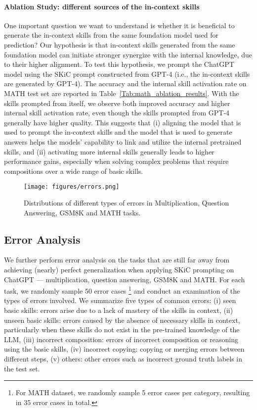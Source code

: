 \paragraph{Ablation Study: different sources of the in-context skills} One important question we want to understand is whether it is beneficial to generate the in-context skills from the same foundation model used for prediction? Our hypothesis is that in-context skills generated from the same foundation model can initiate stronger synergize with the internal knowledge, due to their higher alignment. To test this hypothesis, we prompt the ChatGPT model using the SKiC prompt constructed from GPT-4 (i.e., the in-context skills are generated by GPT-4). The accuracy and the internal skill activation rate on MATH test set are reported in Table~\ref{Tab:math_ablation_results}. With the skills prompted from itself, we observe both improved accuracy and higher internal skill activation rate, even though the skills prompted from GPT-4 generally have higher quality. This suggests that (i) aligning the model that is used to prompt the in-context skills and the model that is used to generate answers helps the models' capability to link and utilize the internal pretrained skills, and (ii) activating more internal skills generally leads to higher performance gains, especially when solving complex problems that require compositions over a wide range of basic skills.


 
\begin{figure}[t]
    \centering
    \texttt{[image: figures/errors.png]}
    \caption{Distributions of different types of errors in Multiplication, Question Answering, GSM8K and MATH tasks.}
    \label{fig:errors}
\end{figure}

\subsection{Error Analysis}
We further perform error analysis on the tasks that are still far away from achieving (nearly) perfect generalization when applying SKiC prompting on ChatGPT --- multiplication, question answering, GSM8K and MATH. For each task, we randomly sample 50 error cases \footnote{For MATH dataset, we randomly sample 5 error cases per category, resulting in 35 error cases in total.} \citep{zhou2022least} and conduct an examination of the types of errors involved. We summarize five types of common errors: (i) seen basic skills: errors arise due to a lack of mastery of the skills in context, (ii) unseen basic skills: errors caused by the absence of necessary skills in context, particularly when these skills do not exist in the pre-trained knowledge of the LLM, (iii) incorrect composition: errors of incorrect composition or reasoning using the basic skills, (iv) incorrect copying: copying or merging errors between different steps, (v) others: other errors such as incorrect ground truth labels in the test set. 

